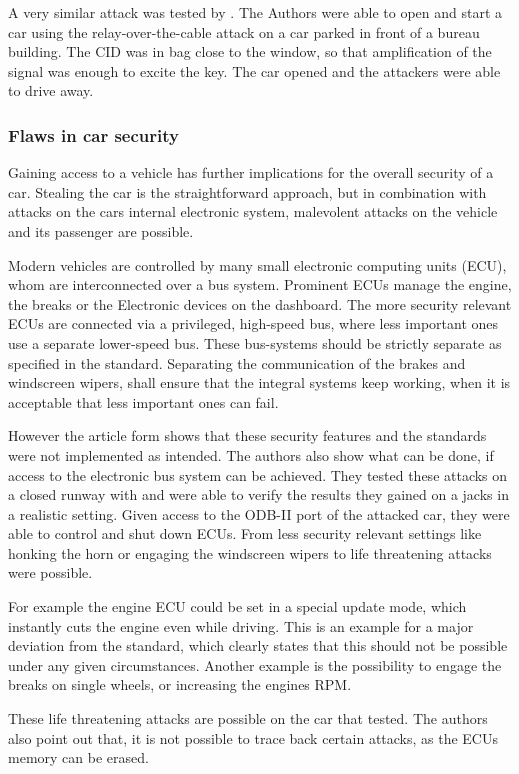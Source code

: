 	A very similar attack was tested by \citeauthor{relayAttacksFranc}.
	The Authors were able to open and start a car using the relay-over-the-cable 
	attack on a car parked in front of a bureau building.
	The CID was in bag close to the window,
	so that amplification of the signal was enough to excite the key.
	The car opened and the attackers were able to drive away.

	\subsubsection*{Flaws in car security}
	Gaining access to a vehicle has further implications for the overall security of a car.
	Stealing the car is the straightforward approach,
	but in combination with attacks on the cars internal electronic system,
	malevolent attacks on the vehicle and its passenger are possible.

	Modern vehicles are controlled by many small electronic computing units (ECU),
	whom are interconnected over a bus system.
	Prominent ECUs manage the engine, the breaks or the Electronic devices on the dashboard.
	The more security relevant ECUs are connected via a privileged,
	high-speed bus,
	where less important ones use a separate lower-speed bus.
	These bus-systems should be strictly separate as specified in the standard. %
	Separating the communication of the brakes and windscreen wipers,
	shall ensure that the integral systems keep working,
	when it is acceptable that less important ones can fail.

	However the article form \citeauthor{expModernAuto}
	shows that these security features and the standards were not implemented as intended.
	The authors also show what can be done,
	if access to the electronic bus system can be achieved.
	They tested these attacks on a closed runway with
	and were able to verify the results they gained on a jacks in a realistic setting.
	Given access to the ODB-II port of the attacked car,
	they were able to control and shut down ECUs.
	From less security relevant settings like honking the horn or
	engaging the windscreen wipers to life threatening attacks were possible.

	For example the engine ECU could be set in a special update mode,
	which instantly cuts the engine even while driving.
	This is an example for a major deviation from the standard,
	which clearly states that this should not be possible under any given circumstances.
	Another example is the possibility to engage the breaks on single wheels,
	or increasing the engines RPM.

	These life threatening attacks are possible on the car that \citeauthor{expModernAuto} tested.
	The authors also point out that,
	it is not possible to trace back certain attacks,
	as the ECUs memory can be erased.

